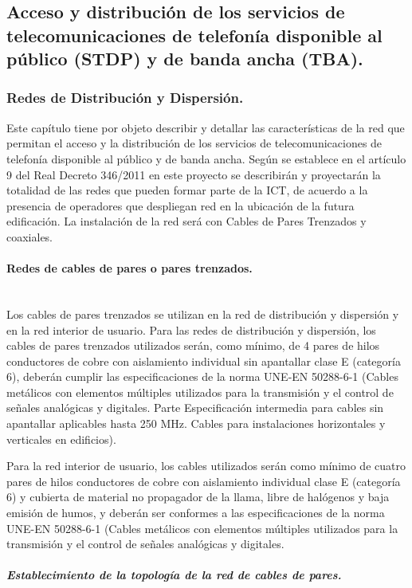 \subsection{Acceso y distribución de los servicios de telecomunicaciones de telefonía disponible al público (STDP) y de banda ancha (TBA).}
\subsubsection{Redes de Distribución y Dispersión.}
Este capítulo tiene por objeto describir y detallar las características de la red que permitan el
acceso y la distribución de los servicios de telecomunicaciones de telefonía disponible al público y
de banda ancha.
Según se establece en el artículo 9 del Real Decreto 346/2011 en este proyecto se describirán y
proyectarán la totalidad de las redes que pueden formar parte de la ICT, de acuerdo a la
presencia de operadores que despliegan red en la ubicación de la futura edificación.
La instalación de la red será con Cables de Pares Trenzados y coaxiales.
\paragraph{Redes de cables de pares o pares trenzados.}\textbf{}\\
Los cables de pares trenzados se utilizan en la red de distribución y
dispersión y en la red interior de usuario.
Para las redes de distribución y dispersión, los cables de pares trenzados
utilizados serán, como mínimo, de 4 pares de hilos conductores de cobre con
aislamiento individual sin apantallar clase E (categoría 6), deberán cumplir las
especificaciones de la norma UNE-EN 50288-6-1 (Cables metálicos con
elementos múltiples utilizados para la transmisión y el control de señales
analógicas y digitales. Parte Especificación intermedia para cables sin
apantallar aplicables hasta 250 MHz. Cables para instalaciones horizontales y
verticales en edificios).

Para la red interior de usuario, los cables utilizados serán como mínimo de
cuatro pares de hilos conductores de cobre con aislamiento individual clase E
(categoría 6) y cubierta de material no propagador de la llama, libre de
halógenos y baja emisión de humos, y deberán ser conformes a las
especificaciones de la norma UNE-EN 50288-6-1 (Cables metálicos con
elementos múltiples utilizados para la transmisión y el control de señales
analógicas y digitales. 
\subparagraph{Establecimiento de la topología de la red de cables de pares.}

